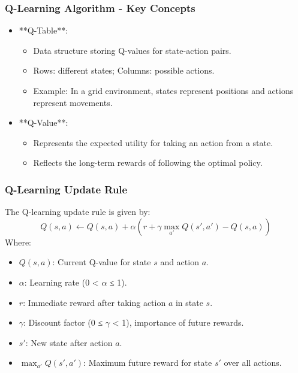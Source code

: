 \documentclass[aspectratio=169]{beamer}
\begin{document}
\begin{frame}[fragile]
    \frametitle{Q-Learning Algorithm - Key Concepts}
    \begin{itemize}
        \item **Q-Table**:
            \begin{itemize}
                \item Data structure storing Q-values for state-action pairs.
                \item Rows: different states; Columns: possible actions.
                \item Example: In a grid environment, states represent positions and actions represent movements.
            \end{itemize}
        
        \item **Q-Value**:
            \begin{itemize}
                \item Represents the expected utility for taking an action from a state.
                \item Reflects the long-term rewards of following the optimal policy.
            \end{itemize}
    \end{itemize}
\end{frame}

\begin{frame}[fragile]
    \frametitle{Q-Learning Update Rule}
    The Q-learning update rule is given by:
    \begin{equation}
        Q(s, a) \leftarrow Q(s, a) + \alpha \left( r + \gamma \max_{a'} Q(s', a') - Q(s, a) \right)
    \end{equation}
    Where:
    \begin{itemize}
        \item \( Q(s, a) \): Current Q-value for state \( s \) and action \( a \).
        \item \( \alpha \): Learning rate (0 < \( \alpha \) ≤ 1).
        \item \( r \): Immediate reward after taking action \( a \) in state \( s \).
        \item \( \gamma \): Discount factor (0 ≤ \( \gamma \) < 1), importance of future rewards.
        \item \( s' \): New state after action \( a \).
        \item \( \max_{a'} Q(s', a') \): Maximum future reward for state \( s' \) over all actions.
    \end{itemize}
\end{frame}
\end{document}
